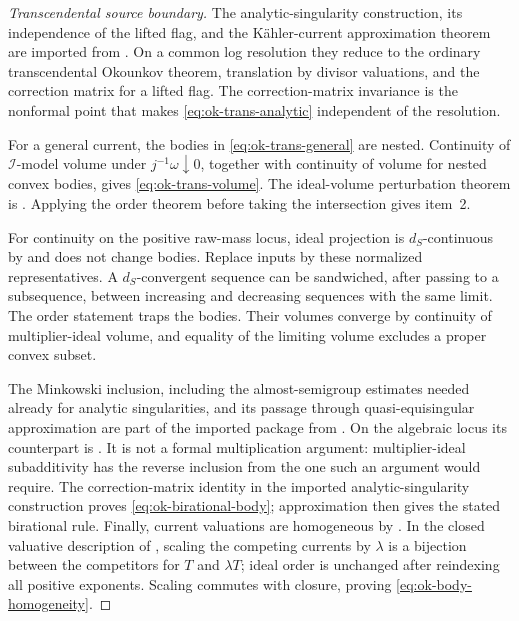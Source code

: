 \begin{proof}[Transcendental source boundary]
The analytic-singularity construction, its independence of the lifted
flag, and the K\"ahler-current approximation theorem are imported from
\cite[Definitions~10.4.2--10.4.4, Lemmas~10.4.1--10.4.5 and
Theorem~10.4.2]{XiaBook}.  On a common log resolution they reduce to the ordinary
transcendental Okounkov theorem, translation by divisor valuations, and the
correction matrix for a lifted flag.  The correction-matrix invariance is
the nonformal point that makes \eqref{eq:ok-trans-analytic} independent of
the resolution.

For a general current, the bodies in
\eqref{eq:ok-trans-general} are nested.  Continuity of
$\mathcal I$-model volume under $j^{-1}\omega\downarrow0$, together
with continuity of volume for nested convex bodies, gives
\eqref{eq:ok-trans-volume}.  The ideal-volume perturbation theorem is
\cite[Proposition~7.3.1]{XiaBook}.  Applying the order theorem before taking the
intersection gives item~2.

For continuity on the positive raw-mass locus, ideal projection is
$d_S$-continuous by \cite[Theorem~6.2.3]{XiaBook} and does not change
bodies.  Replace inputs by these normalized representatives.
A $d_S$-convergent sequence can be sandwiched, after passing to a
subsequence, between increasing and decreasing sequences with the same
limit.
The order statement traps the bodies.
Their volumes converge by continuity of multiplier-ideal volume, and equality of
the limiting volume excludes a proper convex subset.

The Minkowski inclusion, including the almost-semigroup estimates needed
already for analytic singularities, and its passage through
quasi-equisingular approximation are part of the imported package from
\cite[Theorem~10.4.2(6)]{XiaBook}.  On the algebraic locus its
counterpart is \cite[Proposition~5.13]{Xia21}.
It is not a formal multiplication argument: multiplier-ideal subadditivity
has the reverse inclusion from the one such an argument would require.
The correction-matrix identity in the imported analytic-singularity
construction proves \eqref{eq:ok-birational-body}; approximation then
gives the stated birational rule.
Finally, current valuations are homogeneous by
\cite[Proposition~10.2.2]{XiaBook}.  In the closed valuative description
of \cite[Theorem~10.4.4]{XiaBook}, scaling the competing currents by
$\lambda$ is a bijection between the competitors for $T$ and $\lambda T$;
ideal order is unchanged after reindexing all positive exponents.
Scaling commutes with closure, proving \eqref{eq:ok-body-homogeneity}.
\end{proof}

